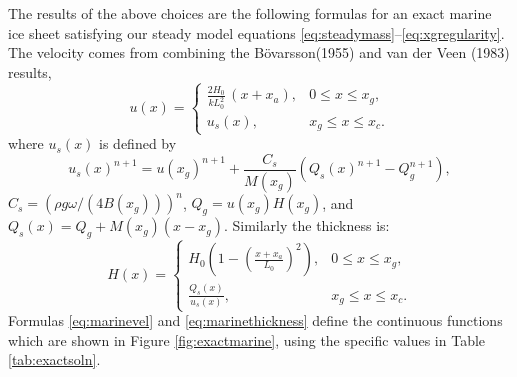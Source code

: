 \documentclass[review,letterpaper]{igs}
\renewcommand{\dh}{\fontencoding{T1}\selectfont{\symbol{240}}}
\newcommand{\bod}{B\"o\dh varsson\xspace}
\begin{document}
The results of the above choices are the following formulas for an exact marine ice sheet satisfying our steady model equations \eqref{eq:steadymass}--\eqref{eq:xgregularity}.  The velocity comes from combining the \bod (1955) and van der Veen (1983) results,
\begin{equation}
u(x) = \begin{cases} \frac{2 H_0}{k L_0^2}\,(x + x_a), & 0 \le x \le x_g, \\
                     u_s(x), & x_g \le x \le x_c.
       \end{cases} \label{eq:marinevel}
\end{equation}
where $u_s(x)$ is defined by
\begin{equation}
u_s(x)^{n+1} = u(x_g)^{n+1} + \frac{C_s}{M(x_g)} \left(Q_s(x)^{n+1} - Q_g^{n+1}\right), \label{eq:vanderveenvel}
\end{equation}
$C_s = \left(\rho g \omega/(4 B(x_g))\right)^n$, $Q_g = u(x_g) H(x_g)$, and $Q_s(x) = Q_g + M(x_g) (x-x_g)$.  Similarly the thickness is:
\begin{equation}
H(x) = \begin{cases} H_0 \left(1 - (\frac{x+x_a}{L_0})^2\right), & 0 \le x \le x_g, \\
                     \frac{Q_s(x)}{u_s(x)}, & x_g \le x \le x_c.
       \end{cases} \label{eq:marinethickness}
\end{equation}
Formulas \eqref{eq:marinevel} and \eqref{eq:marinethickness} define the continuous functions which are shown in Figure \ref{fig:exactmarine}, using the specific values in Table \ref{tab:exactsoln}.
\end{document}
